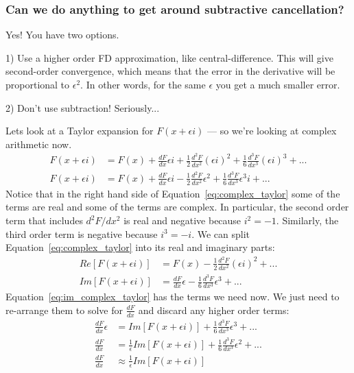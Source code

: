 \documentclass[conf]{new-aiaa}
\begin{document}
    \subsubsection*{Can we do anything to get around subtractive cancellation?}

    Yes! You have two options. 

    1) Use a higher order FD approximation, like central-difference. 
    This will give second-order convergence, which means that the error in the derivative will be proportional to $\epsilon^2$. 
    In other words, for the same $\epsilon$ you get a much smaller error. 

    2) Don't use subtraction! Seriously...

    Lets look at a Taylor expansion for $F(x+\epsilon i)$ --- so we're looking at complex arithmetic now. 
    \begin{align}
        F(x+\epsilon i) &= F(x) + \frac{dF}{dx}\epsilon i + \frac{1}{2}\frac{d^2F}{dx^2} (\epsilon i)^2 +  \frac{1}{6}\frac{d^3F}{dx^3} (\epsilon i)^3 + ... \\
        F(x+\epsilon i) &= F(x) + \frac{dF}{dx}\epsilon i - \frac{1}{2}\frac{d^2F}{dx^2} \epsilon^2 +  \frac{1}{6}\frac{d^3F}{dx^3} \epsilon^3 i + ... \label{eq:complex_taylor}
    \end{align}
    Notice that in the right hand side of Equation~\eqref{eq:complex_taylor} some of the terms are real and some of the terms are complex. 
    In particular, the second order term that includes $d^2F/dx^2$ is real and negative because $i^2=-1$.  
    Similarly, the third order term is negative because $i^3=-i$.
    We can split Equation~\eqref{eq:complex_taylor} into its real and imaginary parts: 
    \begin{align}
        Re[F(x+\epsilon i)] &= F(x) - \frac{1}{2}\frac{d^2F}{dx^2} (\epsilon i)^2 + ... \\
        Im[F(x+\epsilon i)] &= \frac{dF}{dx}\epsilon -  \frac{1}{6}\frac{d^3F}{dx^3} \epsilon^3 + ... \label{eq:im_complex_taylor}
    \end{align}
    Equation~\eqref{eq:im_complex_taylor} has the terms we need now. 
    We just need to re-arrange them to solve for $\frac{dF}{dx}$ and discard any higher order terms: 
    \begin{align}
        \frac{dF}{dx}\epsilon  &= Im[F(x+\epsilon i)] + \frac{1}{6}\frac{d^3F}{dx^3} \epsilon^3 + ... \\
        \frac{dF}{dx}  &= \frac{1}{\epsilon}Im[F(x+\epsilon i)] + \frac{1}{6}\frac{d^3F}{dx^3} \epsilon^2 + ... \\
        \frac{dF}{dx}  &\approx \frac{1}{\epsilon}Im[F(x+\epsilon i)] \label{eq:complex_step}
    \end{align}
\end{document}
